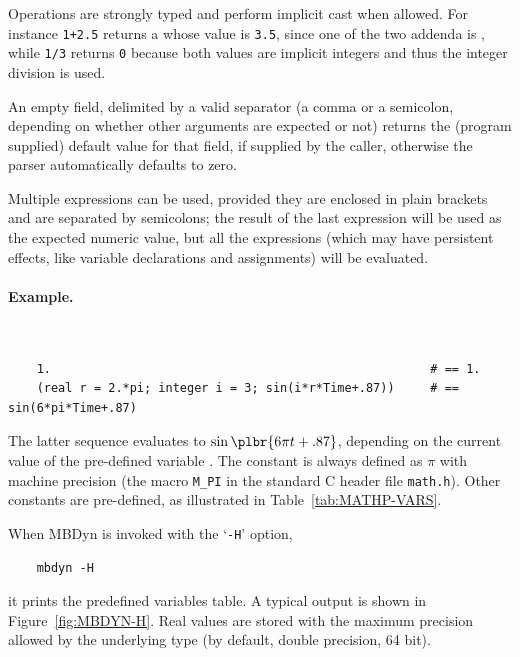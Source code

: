 Operations are strongly typed and perform implicit cast when allowed.
For instance \texttt{1+2.5} returns a  whose value 
is \texttt{3.5}, since one of the 
two addenda is , while \texttt{1/3} returns \texttt{0} because 
both values are implicit integers and thus the integer division is used.

An empty field, delimited by a valid separator (a comma or a semicolon,
depending on whether other arguments are expected or not) returns the
(program supplied) default value for that field, if supplied by the caller, 
otherwise the parser automatically defaults to zero.

Multiple expressions can be used, provided they are enclosed in plain 
brackets and are separated by semicolons; the result 
of the last expression will be used as the expected numeric value,
but all the expressions (which may have persistent effects, 
like variable declarations and assignments) will be evaluated.

\paragraph{Example.} \
\begin{verbatim}
    1.                                                     # == 1.
    (real r = 2.*pi; integer i = 3; sin(i*r*Time+.87))     # == sin(6*pi*Time+.87)
\end{verbatim}
The latter sequence evaluates to $ \sin\plbr{6\pi{t}+.87} $,
depending on the current value of the pre-defined variable .
The constant \kw{pi} is always defined as $ \pi $ with machine precision
(the macro \texttt{M\_PI} in the standard C header file \texttt{math.h}).
Other constants are pre-defined, as illustrated
in Table~\ref{tab:MATHP-VARS}.

When MBDyn is invoked with the `\texttt{-H}' option,
\begin{verbatim}
    mbdyn -H
\end{verbatim}
it prints the predefined variables table.
A typical output is shown in Figure~\ref{fig:MBDYN-H}.
Real values are stored with the maximum precision allowed by the underlying
\kw{real} type (by default, double precision, 64 bit).

